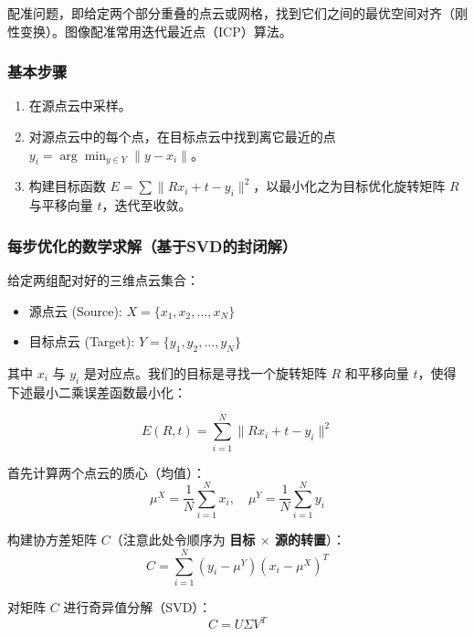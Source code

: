 \documentclass[12pt]{article}
\begin{document}
配准问题，即给定两个部分重叠的点云或网格，找到它们之间的最优空间对齐（刚性变换）。图像配准常用迭代最近点（ICP）算法。

\subsubsection{基本步骤}

\begin{enumerate}
    \item 在源点云中采样。
    \item 对源点云中的每个点，在目标点云中找到离它最近的点$y_i = \arg \min_{y \in Y} \|y - x_i\|$。
    \item 构建目标函数 $E = \sum \| R x_i + t - y_i \|^2$，以最小化之为目标优化旋转矩阵 $R$ 与平移向量 $t$，迭代至收敛。
\end{enumerate}

\subsubsection{每步优化的数学求解（基于SVD的封闭解）}

给定两组配对好的三维点云集合：
\begin{itemize}
    \item 源点云 (Source): $X = \{ x_1, x_2, \dots, x_N \}$
    \item 目标点云 (Target): $Y = \{ y_1, y_2, \dots, y_N \}$
\end{itemize}

其中 $x_i$ 与 $y_i$ 是对应点。我们的目标是寻找一个旋转矩阵 $R$ 和平移向量 $t$，使得下述最小二乘误差函数最小化：

\begin{equation}
    E(R, t) = \sum_{i=1}^{N} \| R x_i + t - y_i \|^2
\end{equation}

首先计算两个点云的质心（均值）：
\begin{equation}
    \mu^X = \frac{1}{N} \sum_{i=1}^{N} x_i, \quad
    \mu^Y = \frac{1}{N} \sum_{i=1}^{N} y_i
\end{equation}

构建协方差矩阵 $C$（注意此处令顺序为 \textbf{目标 $\times$ 源的转置}）：
\begin{equation}
    C = \sum_{i=1}^{N} (y_i - \mu^Y)(x_i - \mu^X)^T
\end{equation}

对矩阵 $C$ 进行奇异值分解（SVD）：
\begin{equation}
    C = U \Sigma V^T
\end{equation}
\end{document}
